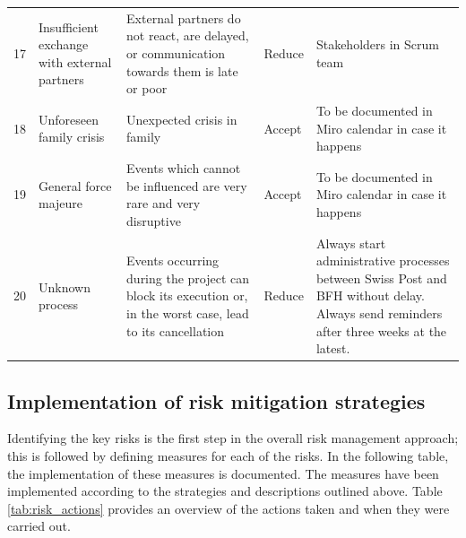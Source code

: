 \begin{longtable}{@{} C{1.2cm} L{2.5cm} L{4.5cm} L{2.5cm} L{5cm} @{}}
17 & Insufficient exchange with external partners & External partners do not react, are delayed, or communication towards them is late or poor & Reduce & Stakeholders in Scrum team \\
18 & Unforeseen family crisis & Unexpected crisis in family & Accept & To be documented in Miro calendar in case it happens \\
19 & General force majeure & Events which cannot be influenced are very rare and very disruptive & Accept & To be documented in Miro calendar in case it happens \\
20 & Unknown process & Events occurring during the project can block its execution or, in the worst case, lead to its cancellation & Reduce & Always start administrative processes between Swiss Post and BFH without delay. Always send reminders after three weeks at the latest. \\
\end{longtable}

\subsection*{Implementation of risk mitigation strategies}
Identifying the key risks is the first step in the overall risk management approach; this is followed by defining measures for each of the risks. In the following table, the implementation of these measures is documented. The measures have been implemented according to the strategies and descriptions outlined above. Table \ref{tab:risk_actions} provides an overview of the actions taken and when they were carried out.


